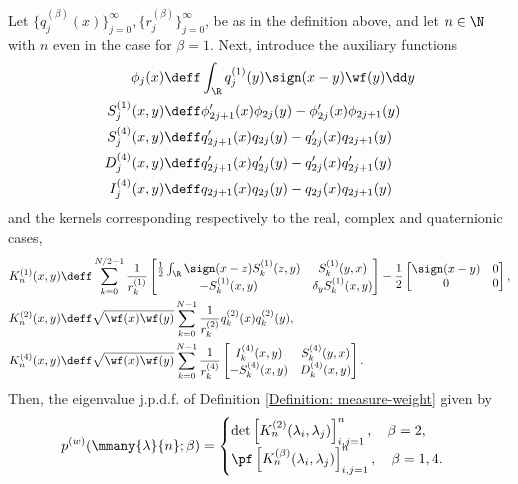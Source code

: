 \begin{teorema}
	Let $\{q_j^{(\beta)}(x)\}_{j=0}^{\infty}, \{r_j^{(\beta)}\}_{j=0}^{\infty}$, be as in the definition above, and let $n \in \N$ with $n$ even in the case for $\beta = 1$. Next, introduce the auxiliary functions
	\begin{align}
		\phi_j(x) & \deff \int_{\R} q_j^{(1)}(y) \sign(x-y) \wf(y) \dd y \\
		S_j^{(1)}(x,y) & \deff \phi'_{2j+1}(x)\phi_{2j}(y) - \phi'_{2j}(x)\phi_{2j+1}(y) \\
		S_j^{(4)}(x,y) & \deff q'_{2j+1}(x)q_{2j}(y) - q'_{2j}(x)q_{2j+1}(y) \\
		D_j^{(4)}(x,y) & \deff q'_{2j+1}(x)q'_{2j}(y) - q'_{2j}(x)q'_{2j+1}(y) \\
		I_j^{(4)}(x,y) & \deff q_{2j+1}(x)q_{2j}(y) - q_{2j}(x)q_{2j+1}(y)
	\end{align}
	and the kernels corresponding respectively to the real, complex and quaternionic cases,
	\begin{align}
		K_n^{(1)}(x,y) & \deff \sum_{k=0}^{N/2-1} \frac{1}{r_k^{(1)}} \begin{bmatrix}
			\frac{1}{2} \int_{\R} \sign(x-z) S_k^{(1)}(z,y) & S_k^{(1)}(y,x) \\
			-S_k^{(1)}(x,y) & \delta_y S_k^{(1)}(x,y)
		\end{bmatrix} 
		- \frac{1}{2} 
		\begin{bmatrix}
			\sign(x-y) & 0 \\
			0 & 0
		\end{bmatrix},   \\
		K_n^{(2)}(x,y) & \deff \sqrt{\wf(x) \wf(y)} \sum_{k=0}^{N-1} \frac{1}{r_k^{(2)}} q_k^{(2)}(x) q_k^{(2)}(y), \\
		K_n^{(4)}(x,y) & \deff \sqrt{\wf(x) \wf(y)} \sum_{k=0}^{N-1} \frac{1}{r_k^{(4)}}
		\begin{bmatrix}
			I_k^{(4)}(x,y) & S_k^{(4)}(y,x) \\
			-S_k^{(4)}(x,y) & D_k^{(4)}(x,y)
		\end{bmatrix}.
	\end{align}
	Then, the eigenvalue j.p.d.f. of Definition \ref{Definition: measure-weight} given by
	\begin{equation}
	p^{(w)}(\mmany{\lambda}{n};\beta) = 
	\begin{cases}
		\det\left[ K_n^{(2)}(\lambda_i, \lambda_j) \right]_{i,j=1}^{n}, \quad \beta = 2, \\
		\pf\left[ K_n^{(\beta)}(\lambda_i, \lambda_j) \right]_{i,j=1}^{n}, \quad \beta = 1,4.
	\end{cases}
	\end{equation}
	\label{Theorem: Kernel}
\end{teorema}


